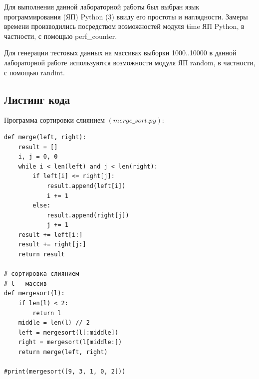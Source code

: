 \documentclass[12pt,a4paper]{scrartcl}
\begin{document}
Для выполнения данной лабораторной работы был выбран язык программирования (ЯП) Python (3) ввиду его простоты и наглядности. Замеры времени производились посредством возможностей модуля time ЯП Python, в частности, с помощью perf\_counter.

Для генерации тестовых данных на массивах выборки 1000..10000 в данной лабораторной работе используются возможности модуля ЯП random, в частности, с помощью randint.



\subsection{Листинг кода}   
Программа сортировки слиянием $(merge\_sort.py):$

\begin{verbatim}
def merge(left, right):
    result = []
    i, j = 0, 0
    while i < len(left) and j < len(right):
        if left[i] <= right[j]:
            result.append(left[i])
            i += 1
        else:
            result.append(right[j])
            j += 1
    result += left[i:]
    result += right[j:]
    return result

# сортировка слиянием
# l - массив
def mergesort(l):
    if len(l) < 2:
        return l
    middle = len(l) // 2
    left = mergesort(l[:middle])
    right = mergesort(l[middle:])
    return merge(left, right)

#print(mergesort([9, 3, 1, 0, 2]))
\end{verbatim}
\end{document}
